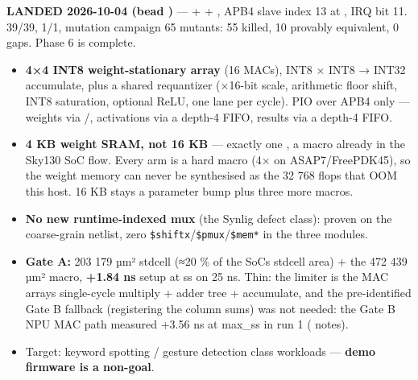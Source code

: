 \begin{record}

\ok{} \textbf{LANDED 2026-10-04 (bead )} ---
 +  +
, APB4 slave index 13 at
, IRQ bit 11.  39/39,
 1/1, mutation campaign 65 mutants: 55 killed, 10
provably equivalent, 0 gaps. Phase 6 is complete.

\begin{itemize}
\tightlist
\item
  \textbf{4×4 INT8 weight-stationary array} (16 MACs), INT8 × INT8 →
  INT32 accumulate, plus a shared requantizer (×16-bit scale, arithmetic
  floor shift, INT8 saturation, optional ReLU, one lane per cycle). PIO
  over APB4 only --- weights via /, activations
  via a depth-4  FIFO, results via a depth-4  FIFO.
\item
  \textbf{4 KB weight SRAM, not 16 KB} --- exactly one
  , a macro already in the
  Sky130 SoC flow. Every  arm is a hard macro (4×
   on ASAP7/\allowbreak{}FreePDK45), so the
  weight memory can never be synthesised as the 32 768 flops that OOM
  this host. 16 KB stays a parameter bump plus three more macros.
\item
  \textbf{No new runtime-indexed mux} (the  Synlig
   defect class): proven on the coarse-grain netlist,
  zero \texttt{\$shiftx}/\texttt{\$pmux}/\texttt{\$mem*} in the three
   modules.
\item
  \textbf{Gate A:} 203 179 µm² stdcell (≈20 \% of the
  SoC\textquotesingle s stdcell area) + the 472 439 µm² macro,
  \textbf{+1.84 ns} setup at ss on 25 ns. Thin: the limiter is the MAC
  array\textquotesingle s single-cycle multiply + adder tree +
  accumulate, and the pre-identified Gate B fallback (registering the
  column sums) was not needed: the Gate B NPU MAC path measured +3.56 ns
  at max\_ss in run 1 ( notes).
\item
  Target: keyword spotting / gesture detection class workloads ---
  \textbf{demo firmware is a non-goal}.
\end{itemize}


\end{record}
